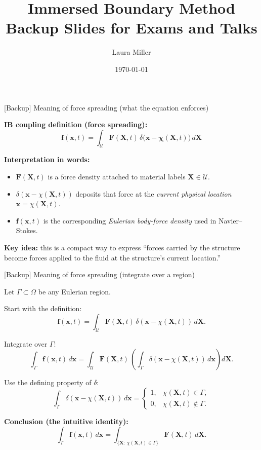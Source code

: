 \documentclass{beamer}
\title{Immersed Boundary Method Backup Slides for Exams and Talks}
\author{Laura Miller}
\date{\today}
\begin{document}

\begin{frame}{[Backup] Meaning of force spreading (what the equation enforces)}
\footnotesize

\textbf{IB coupling definition (force spreading):}
\[
\boxed{
\mathbf{f}(\mathbf{x},t)
=
\int_{\mathcal U}
\mathbf{F}(\mathbf{X},t)\,
\delta\!\big(\mathbf{x}-\boldsymbol{\chi}(\mathbf{X},t)\big)\,d\mathbf{X}
}
\]

\medskip
\textbf{Interpretation in words:}
\begin{itemize}\itemsep3pt
\item $\mathbf{F}(\mathbf{X},t)$ is a force density attached to material labels $\mathbf{X}\in\mathcal U$.
\item $\delta(\mathbf{x}-\chi(\mathbf{X},t))$ deposits that force at the \emph{current physical location}
      $\mathbf{x}=\chi(\mathbf{X},t)$.
\item $\mathbf{f}(\mathbf{x},t)$ is the corresponding \emph{Eulerian body-force density} used in Navier--Stokes.
\end{itemize}

\medskip
\textbf{Key idea:} this is a compact way to express ``forces carried by the structure become forces applied to the fluid
at the structure's current location.''

\end{frame}

\begin{frame}{[Backup] Meaning of force spreading (integrate over a region)}
\footnotesize

Let $\Gamma\subset\Omega$ be any Eulerian region.

\medskip
Start with the definition:
\[
\mathbf{f}(\mathbf{x},t)=\int_{\mathcal U}\mathbf{F}(\mathbf{X},t)\,
\delta(\mathbf{x}-\chi(\mathbf{X},t))\,d\mathbf{X}.
\]

\medskip
Integrate over $\Gamma$:
\[
\int_{\Gamma}\mathbf{f}(\mathbf{x},t)\,d\mathbf{x}
=
\int_{\mathcal U}\mathbf{F}(\mathbf{X},t)\,
\left(\int_{\Gamma}\delta(\mathbf{x}-\chi(\mathbf{X},t))\,d\mathbf{x}\right)d\mathbf{X}.
\]

\medskip
Use the defining property of $\delta$:
\[
\int_{\Gamma}\delta(\mathbf{x}-\chi(\mathbf{X},t))\,d\mathbf{x}
=
\begin{cases}
1, & \chi(\mathbf{X},t)\in\Gamma,\\
0, & \chi(\mathbf{X},t)\notin\Gamma.
\end{cases}
\]

\medskip
\textbf{Conclusion (the intuitive identity):}
\[
\boxed{
\int_{\Gamma}\mathbf{f}(\mathbf{x},t)\,d\mathbf{x}
=
\int_{\{\mathbf{X}:\,\chi(\mathbf{X},t)\in\Gamma\}}\mathbf{F}(\mathbf{X},t)\,d\mathbf{X}.
}
\]

\end{frame}
\end{document}
